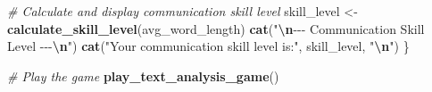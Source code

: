 \documentclass[
]{article}
\newenvironment{Shaded}{\begin{snugshade}}{\end{snugshade}}
\newcommand{\CommentTok}[1]{\textcolor[rgb]{0.56,0.35,0.01}{\textit{#1}}}
\newcommand{\FunctionTok}[1]{\textcolor[rgb]{0.13,0.29,0.53}{\textbf{#1}}}
\newcommand{\NormalTok}[1]{#1}
\newcommand{\OtherTok}[1]{\textcolor[rgb]{0.56,0.35,0.01}{#1}}
\newcommand{\SpecialCharTok}[1]{\textcolor[rgb]{0.81,0.36,0.00}{\textbf{#1}}}
\newcommand{\StringTok}[1]{\textcolor[rgb]{0.31,0.60,0.02}{#1}}
\begin{document}
\begin{Shaded}
\begin{Highlighting}[]
  \CommentTok{\# Calculate and display communication skill level}
\NormalTok{  skill\_level }\OtherTok{\textless{}{-}} \FunctionTok{calculate\_skill\_level}\NormalTok{(avg\_word\_length)}
  \FunctionTok{cat}\NormalTok{(}\StringTok{"}\SpecialCharTok{\textbackslash{}n}\StringTok{{-}{-}{-} Communication Skill Level {-}{-}{-}}\SpecialCharTok{\textbackslash{}n}\StringTok{"}\NormalTok{)}
  \FunctionTok{cat}\NormalTok{(}\StringTok{"Your communication skill level is:"}\NormalTok{, skill\_level, }\StringTok{"}\SpecialCharTok{\textbackslash{}n}\StringTok{"}\NormalTok{)}
\NormalTok{\}}

\CommentTok{\# Play the game}
\FunctionTok{play\_text\_analysis\_game}\NormalTok{()}
\end{Highlighting}
\end{Shaded}
\end{document}
